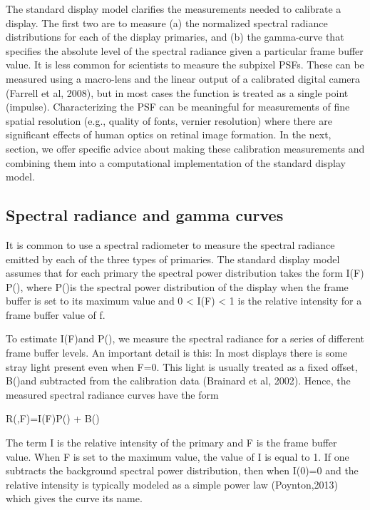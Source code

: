 \documentclass[
  letterpaper,
]{book}
\begin{document}
The standard display model clarifies the measurements needed to
calibrate a display. The first two are to measure (a) the normalized
spectral radiance distributions for each of the display primaries, and
(b) the gamma-curve that specifies the absolute level of the spectral
radiance given a particular frame buffer value. It is less common for
scientists to measure the subpixel PSFs. These can be measured using a
macro-lens and the linear output of a calibrated digital camera (Farrell
et al, 2008), but in most cases the function is treated as a single
point (impulse). Characterizing the PSF can be meaningful for
measurements of fine spatial resolution (e.g., quality of fonts, vernier
resolution) where there are significant effects of human optics on
retinal image formation. In the next, section, we offer specific advice
about making these calibration measurements and combining them into a
computational implementation of the standard display model.

\subsection{Spectral radiance and gamma
curves}\label{spectral-radiance-and-gamma-curves}

It is common to use a spectral radiometer to measure the spectral
radiance emitted by each of the three types of primaries. The standard
display model assumes that for each primary the spectral power
distribution takes the form I(F) P(), where P()is the spectral power
distribution of the display when the frame buffer is set to its maximum
value and 0 \textless{} I(F) \textless{} 1 is the relative intensity for
a frame buffer value of f.

To estimate I(F)and P(), we measure the spectral radiance for a series
of different frame buffer levels. An important detail is this: In most
displays there is some stray light present even when F=0. This light is
usually treated as a fixed offset, B()and subtracted from the
calibration data (Brainard et al, 2002). Hence, the measured spectral
radiance curves have the form

R(,F)=I(F)P() + B()

The term I is the relative intensity of the primary and F is the frame
buffer value. When F is set to the maximum value, the value of I is
equal to 1. If one subtracts the background spectral power distribution,
then when I(0)=0 and the relative intensity is typically modeled as a
simple power law (Poynton,2013) which gives the curve its name.
\end{document}
